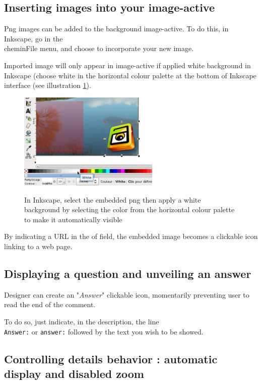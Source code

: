 \subsection{Inserting images into your image-active}\label{insertion_images}

Png images can be added to the background image-active. To do this, in 
Inkscape, go in the \\chemin{File} menu, and choose  
to incorporate your new image.

Imported image will only appear in image-active if applied white background in 
Inkscape (choose white in the horizontal colour palette at the bottom of 
Inkscape interface (see illustration \ref{remplissage_blanc}).

\begin{figure}[htp]
 \centering
 \caption{In Inkscape, select the embedded png then apply a white background 
 by selecting the color from the horizontal colour palette to make it 
 automatically visible} \includegraphics[width=0.6\textwidth]
 {images/remplissage_blanc}
 \label{remplissage_blanc}
\end{figure}

By indicating a URL in the  of  field, 
the embedded image becomes a clickable icon linking to a web page.

\subsection{Displaying a question and unveiling an answer}

Designer can create an "\textit{Answer}" clickable icon, momentarily 
preventing user to read the end of the comment.

To do so, just indicate, in the description, the line\\ \verb|Answer:| or 
\verb|answer:| followed by the text you wish to be showed.

\subsection{Controlling details behavior : automatic display and disabled zoom}
\label{couche_XML}

